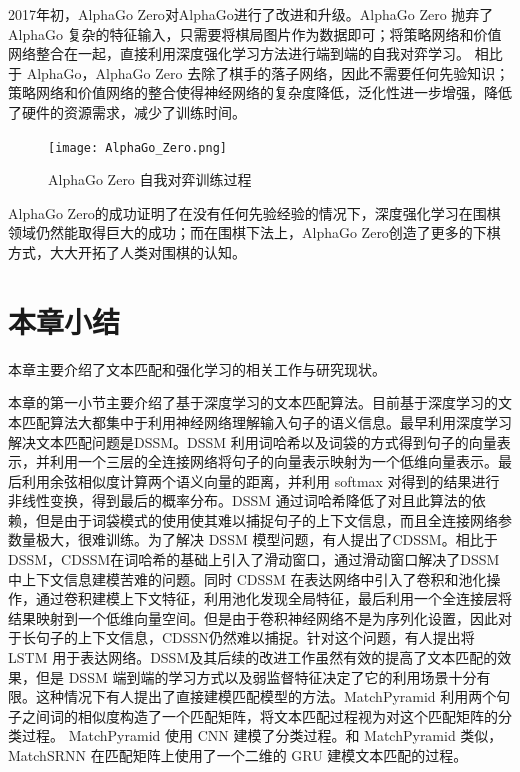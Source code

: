 2017年初，AlphaGo Zero\cite{Silver2017MasteringTG}对AlphaGo进行了改进和升级。AlphaGo Zero 抛弃了 AlphaGo 复杂的特征输入，只需要将棋局图片作为数据即可；将策略网络和价值网络整合在一起，直接利用深度强化学习方法进行端到端的自我对弈学习。
相比于 AlphaGo，AlphaGo Zero 去除了棋手的落子网络，因此不需要任何先验知识；策略网络和价值网络的整合使得神经网络的复杂度降低，泛化性进一步增强，降低了硬件的资源需求，减少了训练时间。
\begin{figure}[!htbp]\centering
\vspace{1em}
  \texttt{[image: AlphaGo\_Zero.png]}
  \caption{AlphaGo Zero 自我对弈训练过程} 
  \label{fig:AlphaGo_Zero}       %
  \vspace{1em}
\end{figure}
AlphaGo Zero的成功证明了在没有任何先验经验的情况下，深度强化学习在围棋领域仍然能取得巨大的成功；而在围棋下法上，AlphaGo Zero创造了更多的下棋方式，大大开拓了人类对围棋的认知。

\section{本章小结}

本章主要介绍了文本匹配和强化学习的相关工作与研究现状。

本章的第一小节主要介绍了基于深度学习的文本匹配算法。目前基于深度学习的文本匹配算法大都集中于利用神经网络理解输入句子的语义信息。最早利用深度学习解决文本匹配问题是DSSM。DSSM 利用词哈希以及词袋的方式得到句子的向量表示，并利用一个三层的全连接网络将句子的向量表示映射为一个低维向量表示。最后利用余弦相似度计算两个语义向量的距离，并利用 softmax 对得到的结果进行非线性变换，得到最后的概率分布。DSSM 通过词哈希降低了对且此算法的依赖，但是由于词袋模式的使用使其难以捕捉句子的上下文信息，而且全连接网络参数量极大，很难训练。为了解决 DSSM 模型问题，有人提出了CDSSM。相比于DSSM，CDSSM在词哈希的基础上引入了滑动窗口，通过滑动窗口解决了DSSM中上下文信息建模苦难的问题。同时 CDSSM 在表达网络中引入了卷积和池化操作，通过卷积建模上下文特征，利用池化发现全局特征，最后利用一个全连接层将结果映射到一个低维向量空间。但是由于卷积神经网络不是为序列化设置，因此对于长句子的上下文信息，CDSSN仍然难以捕捉。针对这个问题，有人提出将 LSTM 用于表达网络。DSSM及其后续的改进工作虽然有效的提高了文本匹配的效果，但是 DSSM 端到端的学习方式以及弱监督特征决定了它的利用场景十分有限。这种情况下有人提出了直接建模匹配模型的方法。MatchPyramid 利用两个句子之间词的相似度构造了一个匹配矩阵，将文本匹配过程视为对这个匹配矩阵的分类过程。 MatchPyramid 使用 CNN 建模了分类过程。和 MatchPyramid 类似， MatchSRNN 在匹配矩阵上使用了一个二维的 GRU 建模文本匹配的过程。

